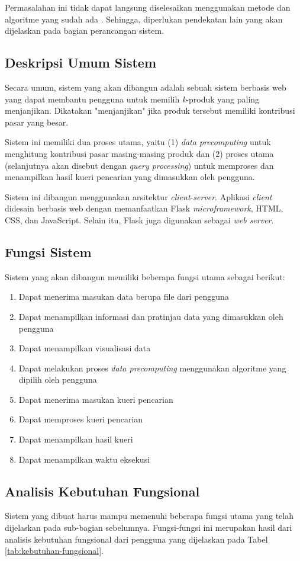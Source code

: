 Permasalahan ini tidak dapat langsung diselesaikan menggunakan metode dan algoritme yang sudah ada \cite{kmpp}. Sehingga, diperlukan pendekatan lain yang akan dijelaskan pada bagian perancangan sistem.

\subsection{Deskripsi Umum Sistem}
\tab Secara umum, sistem yang akan dibangun adalah sebuah sistem berbasis web yang dapat membantu pengguna untuk memilih \textit{k}-produk yang paling menjanjikan. Dikatakan "menjanjikan" jika produk tersebut memiliki kontribusi pasar yang besar.

Sistem ini memiliki dua proses utama, yaitu (1) \textit{data precomputing} untuk menghitung kontribusi pasar masing-masing produk dan (2) proses utama (selanjutnya akan disebut dengan \textit{query processing}) untuk memproses dan menampilkan hasil kueri pencarian yang dimasukkan oleh pengguna.

Sistem ini dibangun menggunakan arsitektur \textit{client}-\textit{server}. Aplikasi \textit{client} didesain berbasis web dengan memanfaatkan Flask \textit{microframework}, HTML, CSS, dan JavaScript. Selain itu, Flask juga digunakan sebagai \textit{web server}. 

\subsection{Fungsi Sistem}
\tab Sistem yang akan dibangun memiliki beberapa fungsi utama sebagai berikut:
\begin{enumerate}
	\item Dapat menerima masukan data berupa file dari pengguna
	\item Dapat menampilkan informasi dan pratinjau data yang dimasukkan oleh pengguna
	\item Dapat menampilkan visualisasi data
	\item Dapat melakukan proses \textit{data precomputing} menggunakan algoritme yang dipilih oleh pengguna
	\item Dapat menerima masukan kueri pencarian 
	\item Dapat memproses kueri pencarian
	\item Dapat menampilkan hasil kueri
	\item Dapat menampilkan waktu eksekusi
\end{enumerate}

\subsection{Analisis Kebutuhan Fungsional}
\tab Sistem yang dibuat harus mampu memenuhi beberapa fungsi utama yang telah dijelaskan pada sub-bagian sebelumnya. Fungsi-fungsi ini merupakan hasil dari analisis kebutuhan fungsional dari pengguna yang dijelaskan pada Tabel \ref{tab:kebutuhan-fungsional}.

